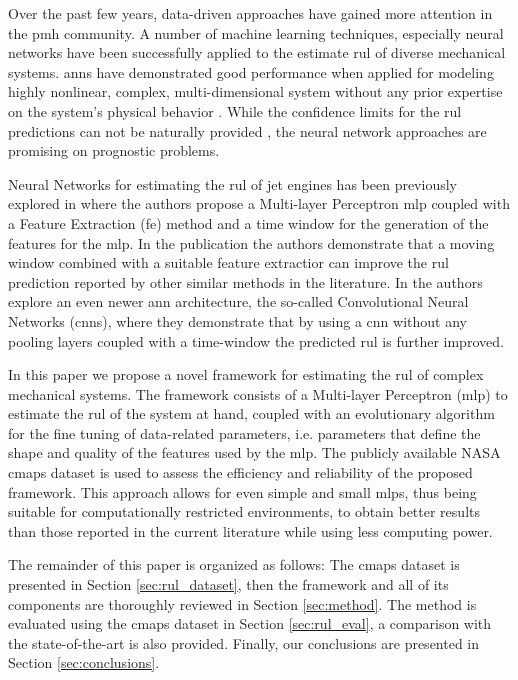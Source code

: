 Over the past few years, data-driven approaches have gained more attention in the \gls{pmh} community. A number of machine learning techniques, especially neural networks have been successfully applied to the estimate \gls{rul} of diverse mechanical systems. \glspl{ann} have demonstrated good performance when applied for modeling highly nonlinear, complex, multi-dimensional system without any prior expertise on the system's physical behavior \cite{Li2018}. While the confidence limits for the \gls{rul} predictions can not be naturally provided \cite{Sikorska2011}, the neural network approaches are promising on prognostic problems.

Neural Networks for estimating the \gls{rul} of jet engines has been previously explored in \cite{Lim2016} where the authors propose a Multi-layer Perceptron \gls{mlp} coupled with a Feature Extraction (\gls{fe}) method and a time window for the generation of the features for the \gls{mlp}. In the publication the authors demonstrate that a moving window combined with a suitable feature extractior can improve the \gls{rul} prediction reported by other similar methods in the literature. In \cite{Li2018} the authors explore an even newer \gls{ann} architecture, the so-called Convolutional Neural Networks (\glspl{cnn}), where they demonstrate that by using a \gls{cnn} without any pooling layers coupled with a time-window the predicted \gls{rul} is further improved.

In this paper we propose a novel framework for estimating the \gls{rul} of complex mechanical systems. The framework consists of a Multi-layer Perceptron (\gls{mlp}) to estimate the \gls{rul} of the system at hand, coupled with an evolutionary algorithm for the fine tuning of data-related parameters, i.e. parameters that define the shape and quality of the features used by the \gls{mlp}. The publicly available NASA \gls{cmaps} dataset \cite{CMAPS2008} is used to assess the efficiency and reliability of the proposed framework. This approach allows for even simple and small \glspl{mlp}, thus being suitable for computationally restricted environments, to obtain better results than those reported in the current literature while using less computing power.

The remainder of this paper is organized as follows: The \gls{cmaps} dataset is presented in Section \ref{sec:rul_dataset}, then the framework and all of its components are thoroughly reviewed in Section \ref{sec:method}. The method is evaluated using the \gls{cmaps} dataset in Section \ref{sec:rul_eval}, a comparison with the state-of-the-art is also provided. Finally, our conclusions are presented in Section \ref{sec:conclusions}.